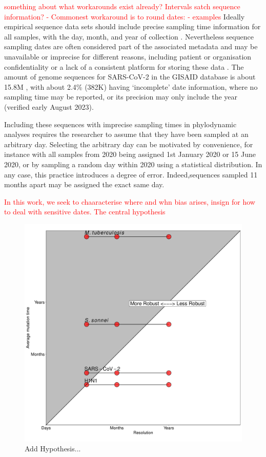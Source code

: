 \documentclass{article}
\begin{document}
\begin{spacing}{1.5}
\textcolor{red}{ something about what workarounds exist already? Intervals satch sequence information? - Commonest workaround is to round dates: - examples}
Ideally empirical sequence data sets should include precise sampling time information for all samples, with the day, month, and year of collection \citep{black2020ten}. Nevertheless sequence sampling dates are often considered part of the associated metadata and may be unavailable or imprecise for different reasons, including patient or organisation confidentiality or a lack of a consistent platform for storing these data \citep{raza2016big}. The amount of genome sequences for SARS-CoV-2 in the GISAID database is about 15.8M \citep{shu2017gisaid}, with about 2.4\% (382K) having `incomplete' date information, where no sampling time may be reported, or its precision may only include the year (verified early August 2023). 

Including these sequences with imprecise sampling times in phylodynamic analyses requires the researcher to assume that they have been sampled at an arbitrary day. Selecting the arbitrary day can be motivated by convenience, for instance with all samples from 2020 being assigned 1st January 2020 or 15 June 2020, or by sampling a random day within 2020 using a statistical distribution. In any case, this practice introduces a degree of error. Indeed,sequences sampled 11 months apart may be assigned the exact same day. 

\textcolor{red}{In this work, we seek to chaaracterise where and whn bias arises, insign for how to deal with sensitive dates. The central hypothesis }
\begin{figure}[h!]
    \centering
    \includegraphics[width = 1\textwidth]{plane.pdf}
    \caption{Add Hypothesis...}
    \label{fig:plane}
\end{figure}


\end{spacing}
\end{document}
